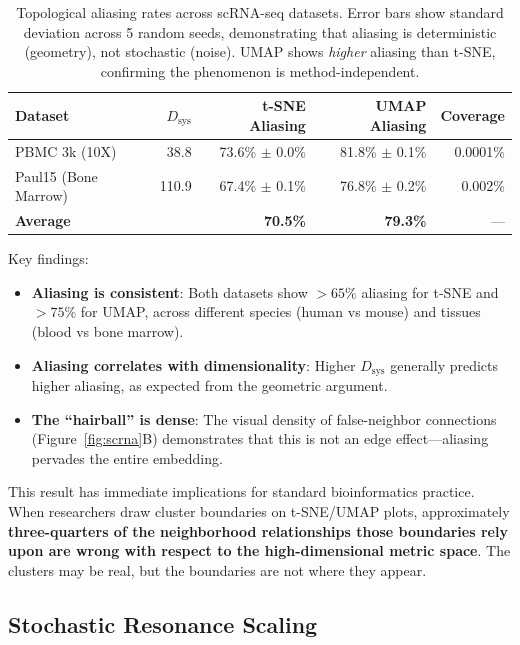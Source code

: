 \documentclass[12pt]{article}
\begin{document}
\begin{table}[h]
\centering
\begin{tabular}{@{}lrrrr@{}}
\toprule
\textbf{Dataset} & \textbf{$D_{\text{sys}}$} & \textbf{t-SNE Aliasing} & \textbf{UMAP Aliasing} & \textbf{Coverage} \\
\midrule
PBMC 3k (10X) & 38.8 & 73.6\% $\pm$ 0.0\% & 81.8\% $\pm$ 0.1\% & 0.0001\% \\
Paul15 (Bone Marrow) & 110.9 & 67.4\% $\pm$ 0.1\% & 76.8\% $\pm$ 0.2\% & 0.002\% \\
\midrule
\textbf{Average} & & \textbf{70.5\%} & \textbf{79.3\%} & --- \\
\bottomrule
\end{tabular}
\caption{Topological aliasing rates across scRNA-seq datasets. Error bars show standard deviation across 5 random seeds, demonstrating that aliasing is deterministic (geometry), not stochastic (noise). UMAP shows \emph{higher} aliasing than t-SNE, confirming the phenomenon is method-independent.}
\label{tab:results}
\end{table}

Key findings:
\begin{itemize}
    \item \textbf{Aliasing is consistent}: Both datasets show $>65\%$ aliasing for t-SNE and $>75\%$ for UMAP, across different species (human vs mouse) and tissues (blood vs bone marrow).
    \item \textbf{Aliasing correlates with dimensionality}: Higher $D_{\text{sys}}$ generally predicts higher aliasing, as expected from the geometric argument.
    \item \textbf{The ``hairball'' is dense}: The visual density of false-neighbor connections (Figure~\ref{fig:scrna}B) demonstrates that this is not an edge effect---aliasing pervades the entire embedding.
\end{itemize}

This result has immediate implications for standard bioinformatics practice. When researchers draw cluster boundaries on t-SNE/UMAP plots, approximately \textbf{three-quarters of the neighborhood relationships those boundaries rely upon are wrong with respect to the high-dimensional metric space}. The clusters may be real, but the boundaries are not where they appear.

\subsection{Stochastic Resonance Scaling}
\end{document}
